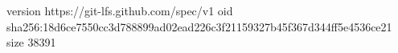 version https://git-lfs.github.com/spec/v1
oid sha256:18d6ce7550cc3d788899ad02ead226c3f21159327b45f367d344ff5e4536ce21
size 38391
